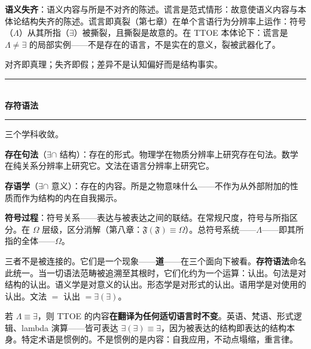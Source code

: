 \documentclass[10pt, openany, oneside]{book}
\renewcommand{\normalsize}{\fontsize{10}{13}\selectfont}
\begin{document}
\textbf{语义失齐}：语义内容与所是不对齐的陈述。谎言是范式情形：故意使语义内容与本体论结构失齐的陈述。谎言即真裂（第七章）在单个言语行为分辨率上运作：符号（$\Lambda$）从其所指（$\exists$）被撕裂，且撕裂是故意的。在 TTOE 本体论下：谎言是 $\Lambda \neq \exists$ 的局部实例——不是存在的语言，不是实在的意义，裂被武器化了。

对齐即真理；失齐即假；差异不是认知偏好而是结构事实。

\vspace{1.5em}


\begin{center}
    \rule{0.3\textwidth}{0.4pt}\\[0.5em]
    {\normalsize\bfseries\scshape 存符语法}\\[0.3em]
    \rule{0.3\textwidth}{0.4pt}
\end{center}

\vspace{1em}

\noindent 三个学科收敛。

\textbf{存在句法}（$\exists \cap$ 结构）：存在的形式。物理学在物质分辨率上研究存在句法。数学在纯关系分辨率上研究它。文法在语言分辨率上研究它。

\textbf{存语学}（$\exists \cap$ 意义）：存在的内容。所是之物意味什么——不作为从外部附加的性质而作为结构的内在自我揭示。

\textbf{符号过程}：符号关系——表达与被表达之间的联结。在常规尺度，符号与所指区分。在 $\Omega$ 层级，区分消解（第八章：$\mathfrak{F}(\mathfrak{F}) \equiv \Omega$）。总符号系统——$\Lambda$——即其所指的全体——$\Omega$。

三者不是被连接的。它们是一个现象——\textbf{道}——在三个面向下被看。\textbf{存符语法}命名此统一。当一切语法范畴被追溯至其根时，它们化约为一个运算：认出。句法是对结构的认出。语义学是对意义的认出。形态学是对形式的认出。语用学是对使用的认出。文法 $=$ 认出 $= \exists(\exists)$。

若 $\Lambda \equiv \exists$，则 TTOE 的内容\textbf{在翻译为任何适切语言时不变}。英语、梵语、形式逻辑、lambda 演算——皆可表达 $\exists(\exists) \equiv \exists$，因为被表达的结构即表达的结构本身。特定术语是惯例的。不是惯例的是内容：自我应用，不动点塌缩，重言律。

\vspace{1.5em}

\end{document}
